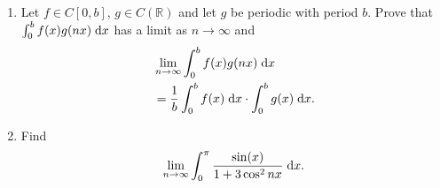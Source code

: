 \documentclass{article}
\begin{document}
	\setlength{\parindent}{0pt}
	\begin{enumerate}[label=\alph*)]
		\item Let $f \in C[0, b]$, $g \in C(\mathbb{R})$ and let $g$ be periodic with period $b$. Prove
		that $\int_{0}^{b}f(x)g(nx)\;\textup{d}x$ has a limit as $n\to\infty$ and
		\begin{align*}
			&\lim_{n\to\infty}\int_{0}^{b}
			f(x)g(nx)\;\textup{d}x \\&=\frac{1}{b}\int_{0}^{b}f(x)\;\textup{d}x  \cdot\int_{0}^{b}g(x)\;\textup{d}x .
		\end{align*}
		\item Find
		$$\lim_{n\to\infty} \int_{0}^{\pi}\frac{\sin(x)}{1 + 3\cos^2 nx}\;\textup{d}x .$$
	\end{enumerate}
\end{document}
